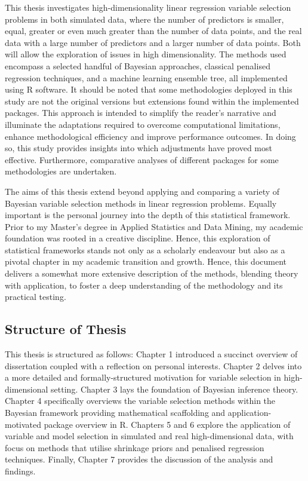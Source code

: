 \documentclass[
  11pt,
]{article}
\begin{document}
This thesis investigates high-dimensionality linear regression variable
selection problems in both simulated data, where the number of
predictors is smaller, equal, greater or even much greater than the
number of data points, and the real data with a large number of
predictors and a larger number of data points. Both will allow the
exploration of issues in high dimensionality. The methods used encompass
a selected handful of Bayesian approaches, classical penalised
regression techniques, and a machine learning ensemble tree, all
implemented using R software. It should be noted that some methodologies
deployed in this study are not the original versions but extensions
found within the implemented packages. This approach is intended to
simplify the reader's narrative and illuminate the adaptations required
to overcome computational limitations, enhance methodological efficiency
and improve performance outcomes. In doing so, this study provides
insights into which adjustments have proved most effective. Furthermore,
comparative analyses of different packages for some methodologies are
undertaken.

The aims of this thesis extend beyond applying and comparing a variety
of Bayesian variable selection methods in linear regression problems.
Equally important is the personal journey into the depth of this
statistical framework. Prior to my Master's degree in Applied Statistics
and Data Mining, my academic foundation was rooted in a creative
discipline. Hence, this exploration of statistical frameworks stands not
only as a scholarly endeavour but also as a pivotal chapter in my
academic transition and growth. Hence, this document delivers a somewhat
more extensive description of the methods, blending theory with
application, to foster a deep understanding of the methodology and its
practical testing.

\subsection{Structure of Thesis}

This thesis is structured as follows: Chapter 1 introduced a succinct
overview of dissertation coupled with a reflection on personal
interests. Chapter 2 delves into a more detailed and formally-structured
motivation for variable selection in high-dimensional setting. Chapter 3
lays the foundation of Bayesian inference theory. Chapter 4 specifically
overviews the variable selection methods within the Bayesian framework
providing mathematical scaffolding and application-motivated package
overview in R. Chapters 5 and 6 explore the application of variable and
model selection in simulated and real high-dimensional data, with focus
on methods that utilise shrinkage priors and penalised regression
techniques. Finally, Chapter 7 provides the discussion of the analysis
and findings.
\end{document}
